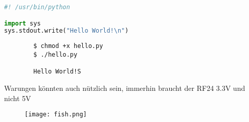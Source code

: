 \documentclass{article}
\begin{document}
\begin{file}[hello.py]
\begin{lstlisting}[language=Python]
#! /usr/bin/python

import sys
sys.stdout.write("Hello World!\n")
\end{lstlisting}
\end{file}



\begin{commandline}
	\begin{verbatim}
		$ chmod +x hello.py
		$ ./hello.py

		Hello World!S
	\end{verbatim}
\end{commandline}


\begin{warn}[Notice:]
  Warungen könnten auch nützlich sein, immerhin braucht der RF24 3.3V und nicht 5V
\end{warn}


\begin{figure}[h]
	\texttt{[image: fish.png]}
	\centering
\end{figure}






\end{document}
